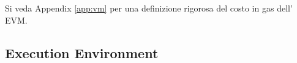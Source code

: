 \documentclass[9pt,oneside]{amsart}
\begin{document}
\begin{multicols}{2}
%
%

Si veda Appendix \ref{app:vm} per una definizione rigorosa del costo in gas dell' EVM.


\subsection{Execution Environment}


\end{multicols}
\end{document}
